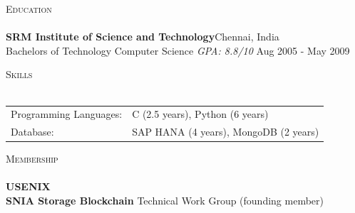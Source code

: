 \documentclass[a4paper]{article}
\newcommand{\lineunder} {
    \vspace*{-8pt} \\
    \hspace*{-18pt} \hrulefill \\
}
\newcommand{\header} [1] {
    {\hspace*{-18pt}\vspace*{6pt} \textsc{#1}}
    \vspace*{-6pt} \lineunder
}
\begin{document}
{\color{blue}\header{Education}}
\textbf{SRM Institute of Science and Technology}\hfill Chennai, India\\
Bachelors of Technology Computer Science \textit{GPA: 8.8/10} \hfill Aug 2005 - May 2009\\
\vspace{2mm}


{\color{blue}\header{Skills}}
\vspace{1mm}
\begin{tabular}{ l l }
	Programming Languages: & C (2.5 years), Python (6 years) \\
	Database: & SAP HANA (4 years), MongoDB (2 years)
\end{tabular}
\vspace{2mm}

{\color{blue}\header{Membership}}
\textbf{USENIX} \\
\textbf{SNIA Storage Blockchain} Technical Work Group (founding member)
\vspace{2mm}
\end{document}
